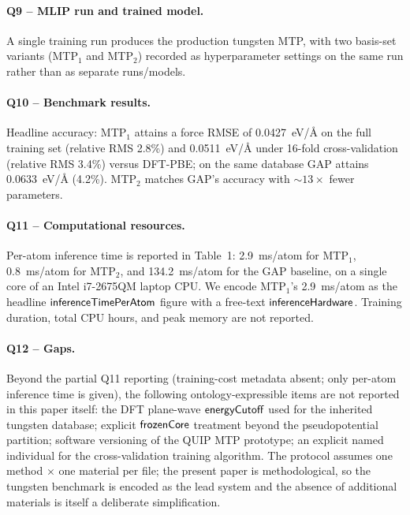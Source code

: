 \paragraph{Q9 -- MLIP run and trained model.}
A single training run produces the production tungsten MTP,
with two basis-set variants (MTP$_1$ and MTP$_2$) recorded as
hyperparameter settings on the same run rather than as separate
runs/models.


\paragraph{Q10 -- Benchmark results.}
Headline accuracy: MTP$_1$ attains a force RMSE of
0.0427~eV/\AA{} on the full training set (relative RMS
2.8\%) and 0.0511~eV/\AA{} under 16-fold cross-validation
(relative RMS 3.4\%) versus DFT-PBE; on the same database GAP
attains 0.0633~eV/\AA{} (4.2\%). MTP$_2$ matches GAP's accuracy
with $\sim 13\times$ fewer parameters.


\paragraph{Q11 -- Computational resources.}
Per-atom inference time is reported in Table~1: 2.9~ms/atom
for MTP$_1$, 0.8~ms/atom for MTP$_2$, and 134.2~ms/atom for the
GAP baseline, on a single core of an Intel i7-2675QM laptop
CPU. We encode MTP$_1$'s 2.9~ms/atom as the headline
$\mathsf{inferenceTimePerAtom}$ figure with a free-text
$\mathsf{inferenceHardware}$. Training duration, total CPU
hours, and peak memory are not reported.


\paragraph{Q12 -- Gaps.}
Beyond the partial Q11 reporting (training-cost metadata
absent; only per-atom inference time is given), the following
ontology-expressible items are not reported in this paper
itself: the DFT plane-wave $\mathsf{energyCutoff}$ used for the
inherited tungsten database; explicit
$\mathsf{frozenCore}$ treatment beyond the pseudopotential
partition; software versioning of the QUIP MTP prototype; an
explicit named individual for the cross-validation training
algorithm. The protocol assumes one method $\times$ one
material per file; the present paper is methodological, so the
tungsten benchmark is encoded as the lead system and the
absence of additional materials is itself a deliberate
simplification.
